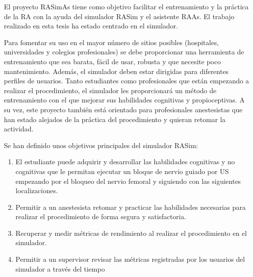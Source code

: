 


El proyecto \ac{RASimAs} tiene como objetivo  facilitar el entrenamiento y la práctica de la \ac{RA} con la ayuda del simulador \ac{RASim} y el asistente \ac{RAAs}. El trabajo realizado en esta tesis ha estado centrado en el simulador.


Para fomentar su uso en el mayor número de sitios posibles (hospitales, universidades y colegios profesionales) se debe proporcionar una herramienta de entrenamiento que sea barata, fácil de usar, robusta y que necesite poco mantenimiento. Además, el simulador deben estar dirigidas para diferentes perfiles de usuarios. Tanto estudiantes como profesionales que están empezando a realizar el procedimiento, el simulador les proporcionará un método de entrenamiento con el que mejorar sus habilidades cognitivas y propioceptivas. A su vez, este proyecto también está orientado para profesionales anestesistas que han estado alejados de la práctica del procedimiento y quieran retomar la actividad.


Se han definido unos objetivos principales del simulador \ac{RASim}:
\begin{enumerate}
    \item El estudiante puede adquirir y desarrollar las habilidades cognitivas y no cognitivas que le permitan ejecutar un bloque de nervio guiado por \ac{US} empezando por el bloqueo del nervio femoral y siguiendo con las siguientes localizaciones.
    \item Permitir a un anestesista retomar y practicar las habilidades necesarias para realizar el procedimiento de forma segura y satisfactoria.
    \item Recuperar y medir métricas de rendimiento al realizar el procedimiento en el simulador. 
    \item Permitir a un supervisor revisar las métricas registradas por los usuarios del simulador a través del tiempo
\end{enumerate}



